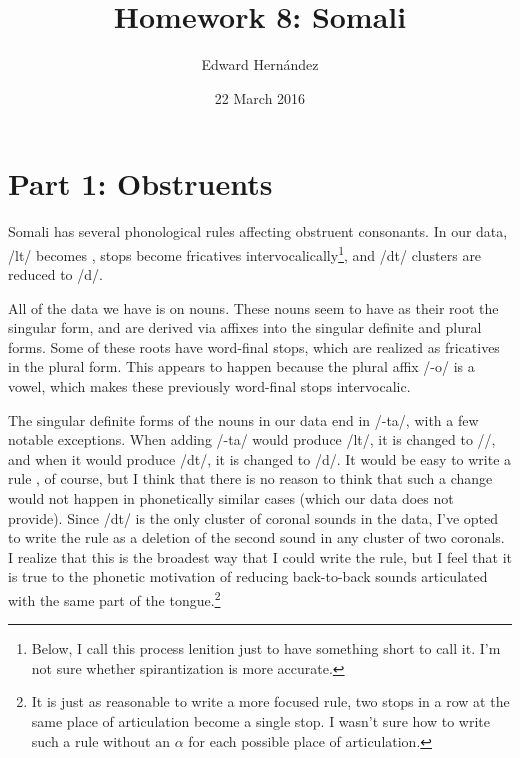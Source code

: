 \documentclass[doc,12pt]{apa6}
\begin{document}
\title{Homework 8: Somali}
\author{Edward Hern\'{a}ndez}
\date{22 March 2016}
\maketitle

\section{Part 1: Obstruents}

Somali has several phonological rules affecting obstruent consonants.  In our
data, /lt/ becomes , stops become fricatives
intervocalically\footnote{Below, I call this process lenition just to have
	something short to call it. I'm not sure whether spirantization is more
accurate.}, and /dt/ clusters are reduced to /d/.

All of the data we have is on nouns. These nouns seem to have as their root the
singular form, and are derived via affixes into the singular definite and
plural forms. Some of these roots have word-final stops, which are realized as 
fricatives in the plural form. This appears to happen because the plural affix /-o/ is a vowel, which makes these previously word-final stops intervocalic.

The singular definite forms of the nouns in our data end in /-ta/, with a few
notable exceptions. When adding /-ta/ would produce /lt/, it is changed to //, and when it would produce /dt/, it is changed to /d/.
It would be easy to write a rule , of course, but I think that
there is no reason to think that such a change would not happen in phonetically
similar cases (which our data does not provide).  Since /dt/ is the only
cluster of coronal sounds in the data, I've opted to write the rule as a
deletion of the second sound in any cluster of two coronals. I realize that
this is the broadest way that I could write the rule, but I feel that it is
true to the phonetic motivation of reducing back-to-back sounds articulated
with the same part of the tongue.\footnote{It is just as reasonable to write a
more focused rule, two stops in a row at the same place of articulation become
a single stop. I wasn't sure how to write such a rule without an $\alpha$ for
each possible place of articulation.}
\end{document}
